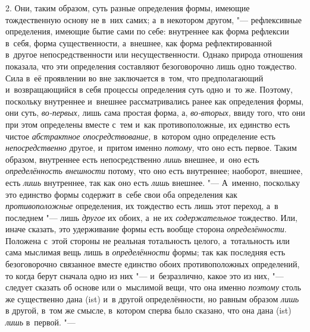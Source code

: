 2. Они, таким образом, суть разные определения формы, имеющие тождественную
основу не в~них самих; а~в некотором другом, "--- рефлексивные определения,
имеющие бытие сами по себе: внутреннее как форма рефлексии в~себя, форма
существенности, а~внешнее, как форма рефлектированной в~другое
непосредственности или несущественности. Однако природа отношения показала,
что эти определения составляют безоговорочно лишь одно тождество. Сила в~её
проявлении во вне заключается в~том, что предполагающий и~возвращающийся в
себя процессы определения суть одно и~то же. Поэтому, поскольку внутреннее
и~внешнее рассматривались ранее как определения формы, они суть,
{\em во-первых,} лишь сама простая форма, а,
{\em во-вторых,} ввиду того, что они при этом
определены вместе с~тем и~как противоположные, их единство есть чистое
{\em абстрактное опосредствование,} в~котором одно
определение есть {\em непосредственно} другое, и~притом
именно {\em потому,} что оно есть первое. Таким
образом, внутреннее есть непосредственно {\em лишь}
внешнее, и~оно есть {\em определённость внешности}
потому, что оно есть внутреннее; наоборот, внешнее, есть
{\em лишь} внутреннее, так как оно есть
{\em лишь} внешнее. "--- А~именно, поскольку это единство
формы содержит в~себе свои оба определения как
{\em противоположные} определения, их тождество есть
лишь этот переход, а~в последнем "--- лишь {\em другое} их
обоих, а~не их {\em содержательное} тождество. Или,
иначе сказать, это удерживание формы есть вообще сторона
{\em определённости}. Положена с~этой стороны не
реальная тотальность целого, а~тотальность или сама мыслимая вещь лишь в
{\em определённости} формы; так как последняя есть
безоговорочно связанное вместе единство обоих противоположных определений,
то когда берут сначала одно из них "--- и~безразлично, какое это из них, "---
следует сказать об основе или о~мыслимой вещи, что она именно
{\em поэтому} столь же существенно дана (ist) и~в
другой определённости, но равным образом {\em лишь} в
другой, в~том же смысле, в~котором сперва было сказано, что она дана (ist)
{\em лишь} в~первой. "---

